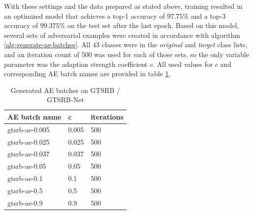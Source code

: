 \documentclass[11pt, a4paper]{article}
\begin{document}
With these settings and the data prepared as stated above, training resulted in an optimized model that achieves a top-1 accuracy of $97.75\%$ and a top-3 accuracy of $99.375\%$ on the test set after the last epoch. Based on this model, several sets of adversarial examples were created in accordance with algorithm \ref{alg:generate-ae-batches}. All $43$ classes were in the \emph{original} and \emph{target} class lists, and an iteration count of 500 was used for each of those sets, so the only variable parameter was the adaption strength coefficient $c$. All used values for $c$ and corresponding AE batch names are provided in table \ref{tab:gtsrb-ae-batches}.

\begin{table}[htb]
	\centering
	\begin{tabular}{|l|l|l|}
		\hline
		AE batch name & c & iterations \\
		\hline
		gtsrb-ae-0.005 & 0.005 & 500 \\
		gtsrb-ae-0.025 & 0.025 & 500 \\
		gtsrb-ae-0.037 & 0.037 & 500 \\
		gtsrb-ae-0.05 & 0.05 & 500 \\
		gtsrb-ae-0.1 & 0.1 & 500 \\
		gtsrb-ae-0.5 & 0.5 & 500 \\
		gtsrb-ae-0.9 & 0.9 & 500 \\
		\hline
	\end{tabular}
	\caption{Generated AE batches on GTSRB / GTSRB-Net}
	\label{tab:gtsrb-ae-batches}
\end{table}

\end{document}
